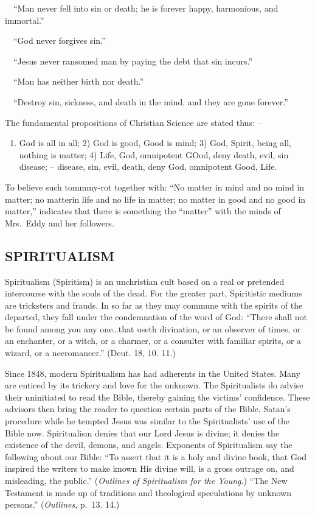 \documentclass[
]{book}
\providecommand{\tightlist}{%
  \setlength{\itemsep}{0pt}\setlength{\parskip}{0pt}}
\begin{document}
~~``Man never fell into sin or death; he is forever happy, harmonious, and immortal.''

~~``God never forgives sin.''

~~``Jesus never ransomed man by paying the debt that sin incurs.''

~~``Man has neither birth nor death.''

~~``Destroy sin, sickness, and death in the mind, and they are gone forever.''

The fundamental propositions of Christian Science are stated thus: --

\begin{enumerate}
\def\labelenumi{\arabic{enumi})}
\tightlist
\item
  God is all in all; 2) God is good, Good is mind; 3) God, Spirit, being all, nothing is matter; 4) Life, God, omnipotent GOod, deny death, evil, sin disease; -- disease, sin, evil, death, deny God, omnipotent Good, Life.
\end{enumerate}

To believe such tommmy-rot together with: ``No matter in mind and no mind in matter; no matterin life and no life in matter; no matter in good and no good in matter,'' indicates that there is something the ``matter'' with the minds of Mrs.~Eddy and her followers.

\subsection{SPIRITUALISM}\label{spiritualism}

Spiritualism (Spiritism) is an unchristian cult based on a real or pretended intercourse with the souls of the dead. For the greater part, Spiritistic mediums are tricksters and frauds. In so far as they may commune with the spirits of the departed, they fall under the condemnation of the word of God: ``There shall not be found among you any one\ldots that useth divination, or an observer of times, or an enchanter, or a witch, or a charmer, or a consulter with familiar spirits, or a wizard, or a necromancer.'' (Deut. 18, 10. 11.)

Since 1848, modern Spiritualism has had adherents in the United States. Many are enticed by its trickery and love for the unknown. The Spiritualists do advise their uninitiated to read the Bible, thereby gaining the victims' confidence. These advisors then bring the reader to question certain parts of the Bible. Satan's procedure while he tempted Jesus was similar to the Spiritualists' use of the Bible now. Spiritualism denies that our Lord Jesus is divine; it denies the existence of the devil, demons, and angels. Exponents of Spiritualism say the following about our Bible: ``To assert that it is a holy and divine book, that God inspired the writers to make known His divine will, is a gross outrage on, and misleading, the public.'' (\emph{Outlines of Spiritualism for the Young}.) ``The New Testament is made up of traditions and theological speculations by unknown persons.'' (\emph{Outlines}, p.~13. 14.)
\end{document}
